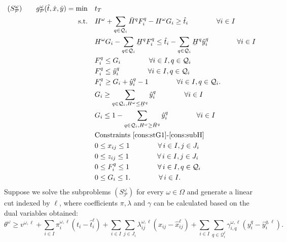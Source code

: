\documentclass[11pt]{article}
\renewcommand{\underbar}{\underaccent{\bar}}
\begin{document}
	\begin{subequations}
		\label{prob:subTightened}
		\begin{align}
		(S_{\mathcal{P}}^\omega) \qquad g^\omega_{\mathcal{P}}(\hat{t},\hat{x},\hat{y}) = \min \quad & t_T \\
		\text{s.t.} \quad & H^\omega + \sum_{q \in \mathcal{Q}_i} \bar{H}^q F_i^q - H^\omega G_i \geq \hat{t}_i \qquad \qquad \forall i \in I \label{cons:sFG1t}\\
		& H^\omega G_i - \sum_{q \in \mathcal{Q}_i} \underbar{H}^q F_i^q \leq \hat{t}_i - \sum_{q \in \mathcal{Q}_i} \underbar{H}^q \hat{y}_i^q \qquad \qquad \forall i \in I \label{cons:sFG2t}\\
		& F_i^q \leq G_i \qquad \qquad \forall i \in I, q \in \mathcal{Q}_i \label{cons:sFGlin1t}\\
		& F_i^q \leq \hat{y}_i^q \qquad \qquad \forall i \in I, q \in \mathcal{Q}_i \label{cons:sFGlin2t}\\
		& F_i^q \geq G_i + \hat{y}_i^q - 1 \qquad \qquad \forall i \in I, q \in \mathcal{Q}_i. \label{cons:sFGlin3t}\\
		& G_i \geq \sum_{q \in \mathcal{Q}_i, H^\omega \leq \underbar{H}^q} \hat{y}_i^q \qquad \qquad \forall i \in I \label{cons:syG1t}\\
		& G_i \leq 1 - \sum_{q \in \mathcal{Q}_i, H^\omega \geq \bar{H}^q} \hat{y}_i^q \qquad \qquad \forall i \in I \label{cons:syG2t}\\
		& \text{Constraints~\eqref{cons:stG1}-\eqref{cons:subH}}\\
		& 0 \leq x_{ij} \leq 1 \qquad \qquad \forall \,i \in I, j \in J_i\\
		& 0 \leq z_{ij} \leq 1 \qquad \qquad \forall \,i \in I, j \in J_i\\
		& 0 \leq F_i^q \leq 1 \qquad \qquad \forall \,i \in I, q \in \mathcal{Q}_i\\
		& 0 \leq G_i \leq 1. \qquad \qquad \forall \,i \in I. \label{cons:G01t}
		\end{align}
	\end{subequations}
	Suppose we solve the subproblems \((S_{\mathcal{P}}^\omega)\) for every \(\omega \in \Omega\) and generate a linear cut indexed by \(\ell\), where coefficients \(\pi,\lambda\) and \(\gamma\) can be calculated based on the dual variables obtained:
	\begin{equation} \label{cons:cut}
		\theta^\omega \geq v^{\omega,\ell} + \sum_{i \in I} \pi_i^{\omega,\ell} (t_i - \hat{t}_i^{\ell}) + \sum_{i \in I} \sum_{j \in J_i} \lambda_{ij}^{\omega,\ell} (x_{ij} - \hat{x}_{ij}^{\ell}) + \sum_{i \in I} \sum_{q \in \mathcal{Q}^{\ell}_i} \gamma_{i,q}^{\omega,\ell} \left( y_i^{q} - \hat{y}_i^{q,\ell} \right).
	\end{equation}
\end{document}
